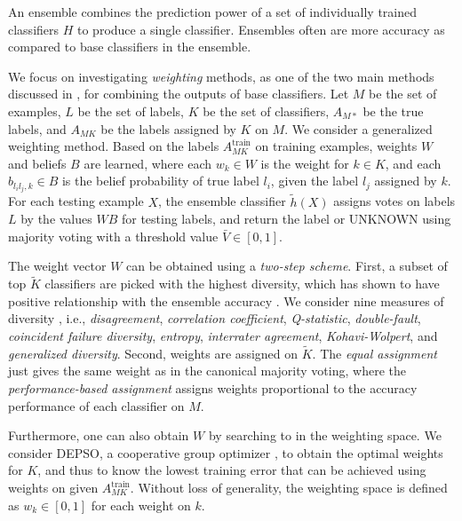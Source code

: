 An ensemble combines the prediction power of a set of individually trained classifiers $H$ to produce a single classifier. Ensembles often are more accuracy as compared to base classifiers in the ensemble. %

We focus on investigating \emph{weighting} methods, as one of the two main methods discussed in \cite{rokach2010ensemble}, for combining the outputs of base classifiers. Let $M$ be the set of examples, $L$ be the set of labels, $K$ be the set of classifiers, $A_{M*}$ be the true labels, and $A_{MK}$ be the labels assigned by $K$ on $M$. We consider a generalized weighting method. Based on the labels $A_{MK}^\text{train}$ on training examples, weights $W$ and beliefs $B$ are learned, where each $w_k \in W$ is the weight for $k\in K$, and each $b_{l_il_j,k} \in B$ is the belief probability of true label $l_i$, given the label $l_j$ assigned by $k$. For each testing example $X$, the ensemble classifier $\tilde{h}(X)$ assigns votes on labels $L$ by the values $WB$ for testing labels, and return the label or UNKNOWN using majority voting with a threshold value $\bar{V} \in [0, 1]$.

The weight vector $W$ can be obtained using a \emph{two-step scheme}. First, a subset of top $\tilde{K}$ classifiers are picked with the highest diversity, which has shown to have positive relationship with the ensemble accuracy \cite{kuncheva2003measures}. We consider nine measures of diversity \cite{kuncheva2003measures}, i.e., \emph{disagreement}, \emph{correlation coefficient}, \emph{Q-statistic}, \emph{double-fault}, \emph{coincident failure diversity}, \emph{entropy}, \emph{interrater agreement}, \emph{Kohavi-Wolpert}, and \emph{generalized diversity}. Second, weights are assigned on $\tilde{K}$. The \emph{equal assignment} just gives the same weight as in the canonical majority voting, where the \emph{performance-based assignment} \cite{opitz1996generating} assigns weights proportional to the accuracy performance of each classifier on $M$.

Furthermore, one can also obtain $W$ by searching to in the weighting space. We consider DEPSO, a cooperative group optimizer \cite{xie2014cooperative}, to obtain the optimal weights for $K$, and thus to know the lowest training error that can be achieved using weights on given $A_{MK}^\text{train}$. Without loss of generality, the weighting space is defined as $w_k\in [0, 1]$ for each weight on $k$.

